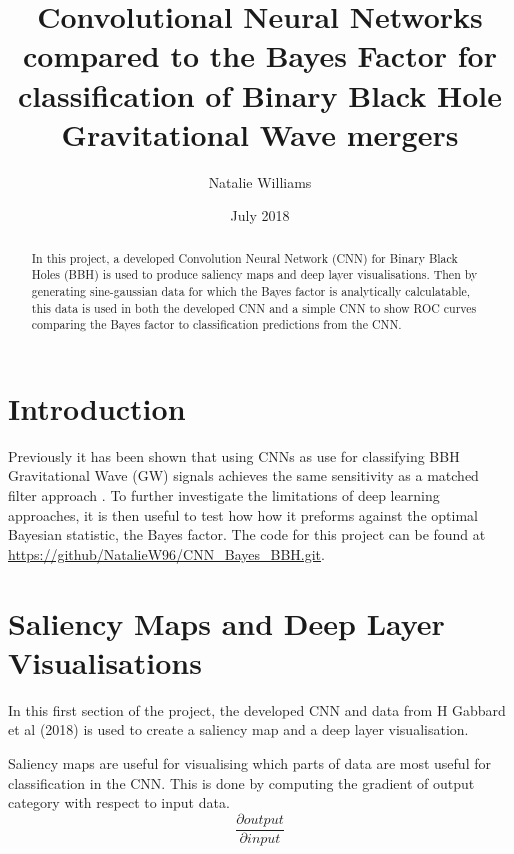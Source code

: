 \documentclass[12pt, letterpaper, twoside]{article}
\title{Convolutional Neural Networks compared to the Bayes Factor for classification of Binary Black Hole Gravitational Wave mergers}
\author{Natalie Williams}
\date{July 2018}
\begin{document}
 
\maketitle

\begin{abstract}
In this project, a developed Convolution Neural Network (CNN) for Binary Black Holes (BBH) is used to produce saliency maps and deep layer visualisations. Then by generating sine-gaussian data for which the Bayes factor is analytically calculatable, this data is used in both the developed CNN and a simple CNN to show ROC curves comparing the Bayes factor to classification predictions from the CNN.
\end{abstract}
 
\section{Introduction}
Previously it has been shown that using CNNs as use for classifying BBH Gravitational Wave (GW) signals achieves the same sensitivity as a matched filter approach \cite{paper}. To further investigate the limitations of deep learning approaches, it is then useful to test how how it preforms against the optimal Bayesian statistic, the Bayes factor\cite{bayes}. The code for this project can be found at \url{https://github/NatalieW96/CNN_Bayes_BBH.git}.
\section{Saliency Maps and Deep Layer Visualisations}
In this first section of the project, the developed CNN and data from H Gabbard et al (2018) is used to create a saliency map and a deep layer visualisation.

Saliency maps are useful for visualising which parts of data are most useful for classification in the CNN. This is done by computing the gradient of output category  with respect to input data.
\[\frac{\partial output}{\partial input}\]
\end{document}
